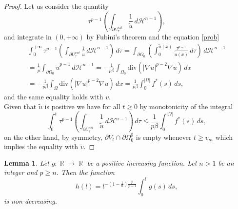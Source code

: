 \documentclass[12pt]{article}
\newcommand{\abs}[1]{{\left|#1\right|}}
\newcommand{\dH}{d\mathcal{H}^{n-1}}
\theoremstyle{definition}
\theoremstyle{plain}
\newtheorem{lemma}[teorema]{Lemma}
\theoremstyle{definition}
\DeclareMathOperator{\R}{\mathbb{R}}
\begin{document}
\begin{proof}
    Let us consider the quantity
    \[\tau^{p-1}\left(\int_{\partial U_\tau^{ext}}\frac{1}{\tilde u}\,\dH\right),\]
    and integrate in $(0,+\infty)$ by Fubini's theorem and the equation \eqref{prob}
    \begin{equation*}
        \begin{aligned}
            \int_0^{+\infty}\tau^{p-1}\left(\int_{\partial U_\tau^{ext}}\frac{1}{\tilde u}\,\dH\right)\,d\tau=\int_{\partial\Omega_0}\left(\int_0^{\tilde u(x)}\frac{\tau^{p-1}}{\tilde u(x)}\,d\tau\right)\,\dH\\=\frac{1}{p}\int_{\partial\Omega_0}\tilde u^{p-1}\,\dH=-\frac{1}{p\beta}\int_{\Omega_0}\mathrm{div}(\abs{\nabla u}^{p-2}\nabla u)\,dx\\=-\frac{1}{p\beta}\int_{\Omega}\mathrm{div}(\abs{\nabla u}^{p-2}\nabla u)\,dx=\frac{1}{p\beta}\int_0^\abs{\Omega}f^\ast(s)\,ds,
        \end{aligned}
    \end{equation*}
    and the same equality holds with $v$.\\
    Given that $\tilde u$ is positive we have for all $t\geq0$ by monotonicity of the integral
    \begin{equation*}
      \int_0^t\tau^{p-1}\left(\int_{\partial U_\tau^{ext}}\frac{1}{\tilde u}\,\dH\right)\,d\tau\leq\frac{1}{p\beta}\int_0^{\abs{\Omega}}f^*(s)\,ds,
    \end{equation*}
    on the other hand, by symmetry, $\partial V_t\cap\partial\Omega_0^\sharp$ is empty whenever $t\geq v_m$ which implies the equality with $\tilde v$.
\end{proof}
\begin{lemma}\label{LemmaPositivis}
    Let $g:\R\to\R$ be a positive increasing function. Let $n>1$ be an integer and $p\geq n$. Then the function
    \begin{equation*}
        h(l)=l^{-\left(1-\frac{1}{n}\right)\frac{p}{p-1}}\int_0^lg(s)\,ds,
    \end{equation*}
    is non-decreasing.
\end{lemma}
\end{document}
